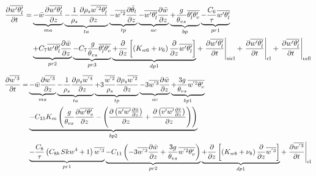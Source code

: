 \documentclass[11pt,fleqn]{article}
\newcommand{\ptlder}[2]{\frac{\partial #1}{\partial #2}}
\newcommand{\inverse}[1]{\frac{1}{#1}}
\begin{document}
%
\begin{equation}
\label{eq_wpthlp}
\begin{split}
\ptlder{\overline{w'\theta'_l}}{t}
= & \underbrace{ - \bar{w}\ptlder{\overline{w'\theta'_l}}{z} }_{ma}	
    \underbrace{ - \inverse{\rho_{s}}\ptlder{\rho_{s}\overline{w^{'2}\theta'_l}}{z} }_{ta}
    \underbrace{ - \overline{w^{'2}}\ptlder{\bar{\theta}_l}{z} }_{tp}
    \underbrace{ - \overline{w'\theta'_l}\ptlder{\bar{w}}{z} }_{ac}
    \underbrace{ + \frac{g}{\theta_{vs}} \overline{\theta'_l\theta'_v} }_{bp}
    \underbrace{ - \frac{C_6}{\tau}\overline{w'\theta'_l} }_{pr1} \\
  & \underbrace{ + C_7 \overline{w'\theta'_l}\ptlder{\bar{w}}{z} }_{pr2}
    \underbrace{ - C_7 \frac{g}{\theta_{vs}} \overline{\theta'_l\theta'_v} }_{pr3}
    \underbrace{ + \ptlder{}{z} \left[ \left( K_{w6} + \nu_6 \right)
                          \ptlder{}{z} \overline{w'\theta'_l} 
                   \right] }_{dp1}
    + \left. \ptlder{\overline{w'\theta'_l}}{t} \right|_{\rm{sicl}}
    + \left. \ptlder{\overline{w'\theta'_l}}{t} \right|_{\rm{cl}}
    + \left. \ptlder{\overline{w'\theta'_l}}{t} \right|_{\rm{mfl}}
\end{split}
\end{equation}
%
\begin{equation}
\label{eq_wp3}
\begin{split}
\ptlder{\overline{w^{'3}}}{t}
= & \underbrace{ - \bar{w}\ptlder{\overline{w^{'3}}}{z} }_{ma}
    \underbrace{ - \inverse{\rho_{s}}\ptlder{\rho_{s}\overline{w^{'4}}}{z} }_{ta}
    \underbrace{ + 3\frac{\overline{w^{'2}}}{\rho_{s}}\ptlder{\rho_{s}\overline{w^{'2}}}{z} }_{tp}
    \underbrace{ - 3\overline{w^{'3}}\ptlder{\bar{w}}{z} }_{ac}
    \underbrace{ + \frac{3g}{\theta_{vs}} \overline{w^{'2}\theta'_v} }_{bp1} \\
  & \underbrace{ - C_{15} K_m \left( 
                           \frac{g}{\theta_{vs}} \ptlder{ \overline{w'\theta'_v} }{z} 
			-\left(
                             \ptlder{\left(\overline{u'w'} \ptlder{\bar{u}}{z}\right)}{z}
                            +\ptlder{\left(\overline{v'w'} \ptlder{\bar{v}}{z}\right)}{z}
			\right) \right)
               }_{bp2} \\
  & \underbrace{ - \frac{C_8}{\tau}\left( C_{8b} \, Skw^4 + 1 \right) \overline{w^{'3}} }_{pr1}
    \underbrace{ - C_{11} \left(
                 - 3 \overline{w^{'3}}\ptlder{\bar{w}}{z}
                 + \frac{3g}{\theta_{vs}} \overline{w^{'2}\theta'_v}
             \right) }_{pr2}
    \underbrace{ + \ptlder{}{z} \left[ \left( K_{w8} + \nu_8 \right)
                          \ptlder{}{z} \overline{w^{'3}} 
                   \right] }_{dp1}
    + \left. \ptlder{\overline{w^{'3}}}{t} \right|_{\rm{cl}}
\end{split}
\end{equation}
\end{document}
